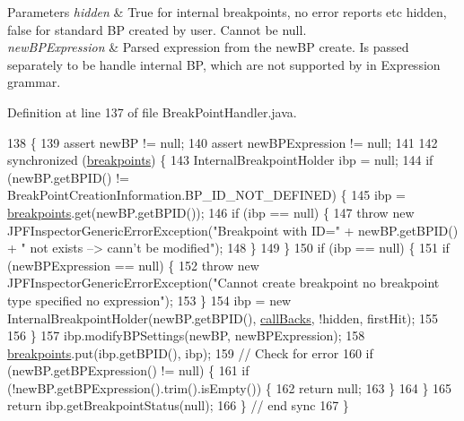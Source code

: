 \begin{DoxyParams}{Parameters}
{\em hidden} & True for internal breakpoints, no error reports etc hidden, false for standard BP created by user. Cannot be null. \\
\hline
{\em new\+B\+P\+Expression} & Parsed expression from the new\+BP create. Is passed separately to be handle internal BP, which are not supported by in Expression grammar. \\
\hline
\end{DoxyParams}


Definition at line 137 of file Break\+Point\+Handler.\+java.


\begin{DoxyCode}
138                                                \{
139     assert newBP != null;
140     assert newBPExpression != null;
141 
142     \textcolor{keyword}{synchronized} (\hyperlink{classgov_1_1nasa_1_1jpf_1_1inspector_1_1server_1_1breakpoints_1_1_break_point_handler_a034265be2e9419b28fa12d1b860295df}{breakpoints}) \{
143       InternalBreakpointHolder ibp = null;
144       \textcolor{keywordflow}{if} (newBP.getBPID() != BreakPointCreationInformation.BP\_ID\_NOT\_DEFINED) \{
145         ibp = \hyperlink{classgov_1_1nasa_1_1jpf_1_1inspector_1_1server_1_1breakpoints_1_1_break_point_handler_a034265be2e9419b28fa12d1b860295df}{breakpoints}.get(newBP.getBPID());
146         \textcolor{keywordflow}{if} (ibp == null) \{
147           \textcolor{keywordflow}{throw} \textcolor{keyword}{new} JPFInspectorGenericErrorException(\textcolor{stringliteral}{"Breakpoint with ID="} + newBP.getBPID() + \textcolor{stringliteral}{" not
       exists --> cann't be modified"});
148         \}
149       \}
150       \textcolor{keywordflow}{if} (ibp == null) \{
151         \textcolor{keywordflow}{if} (newBPExpression == null) \{
152           \textcolor{keywordflow}{throw} \textcolor{keyword}{new} JPFInspectorGenericErrorException(\textcolor{stringliteral}{"Cannot create breakpoint no breakpoint type
       specified no expression"});
153         \}
154         ibp = \textcolor{keyword}{new} InternalBreakpointHolder(newBP.getBPID(), \hyperlink{classgov_1_1nasa_1_1jpf_1_1inspector_1_1server_1_1breakpoints_1_1_break_point_handler_a1ee790b3c2c618b92a860b38e9171bfc}{callBacks}, !hidden, firstHit);
155 
156       \}
157       ibp.modifyBPSettings(newBP, newBPExpression);
158       \hyperlink{classgov_1_1nasa_1_1jpf_1_1inspector_1_1server_1_1breakpoints_1_1_break_point_handler_a034265be2e9419b28fa12d1b860295df}{breakpoints}.put(ibp.getBPID(), ibp);
159       \textcolor{comment}{// Check for error}
160       \textcolor{keywordflow}{if} (newBP.getBPExpression() != null) \{
161         \textcolor{keywordflow}{if} (!newBP.getBPExpression().trim().isEmpty()) \{
162           \textcolor{keywordflow}{return} null;
163         \}
164       \}
165       \textcolor{keywordflow}{return} ibp.getBreakpointStatus(null);
166     \} \textcolor{comment}{// end sync}
167   \}
\end{DoxyCode}
